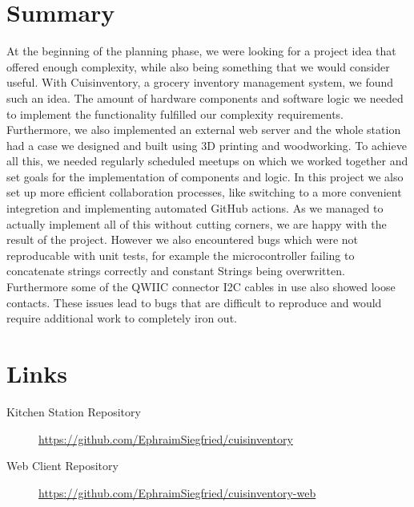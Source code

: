 \documentclass{article}
\begin{document}
\section{Summary}
At the beginning of the planning phase, we were looking for a project idea that offered enough complexity, while also being something that we would consider useful.
With Cuisinventory, a grocery inventory management system, we found such an idea. The amount of hardware components and software logic we needed to implement the functionality fulfilled our complexity requirements.
Furthermore, we also implemented an external web server and the whole station had a case we designed and built using 3D printing and woodworking.
To achieve all this, we needed regularly scheduled meetups on which we worked together and set goals for the implementation of components and logic.
In this project we also set up more efficient collaboration processes, like switching to a more convenient integretion  and implementing automated GitHub actions.
As we managed to actually implement all of this without cutting corners, we are happy with the result of the project.
However we also encountered bugs which were not reproducable with unit tests, for example the microcontroller failing to concatenate strings correctly and constant Strings being overwritten.
Furthermore some of the QWIIC connector I2C cables in use also showed loose contacts.
These issues lead to bugs that are difficult to reproduce and would require additional work to completely iron out.

\section{Links}

\begin{description}
	\item [Kitchen Station Repository]\url{https://github.com/EphraimSiegfried/cuisinventory}
	\item[Web Client Repository] \url{https://github.com/EphraimSiegfried/cuisinventory-web}
\end{description}
\end{document}
